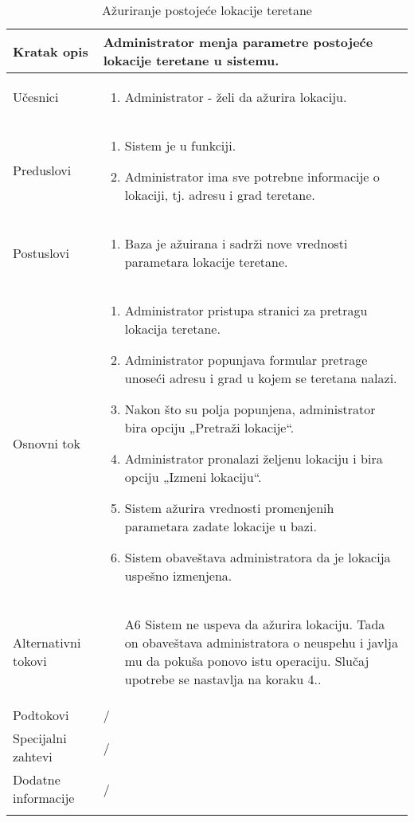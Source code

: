 \documentclass[../main.tex]{subfiles}
\begin{document}
\begin{longtable}{| p{} | p{} |} 

\hline
    Kratak opis &  Administrator menja parametre postojeće lokacije teretane u sistemu.\\ 
\hline    
    Učesnici & 
    	\begin{enumerate}
        \item Administrator - želi da ažurira lokaciju.
     \end{enumerate}\\
\hline
   Preduslovi & \begin{enumerate}
       \item Sistem je u funkciji.
       \item Administrator ima sve potrebne informacije o lokaciji, tj. adresu i grad teretane.
   \end{enumerate}\\
\hline  
    Postuslovi & \begin{enumerate}
        \item Baza je ažuirana i sadrži nove vrednosti parametara lokacije teretane.
    \end{enumerate}\\
\hline
    Osnovni tok & \begin{enumerate}
        \item Administrator pristupa stranici za pretragu lokacija teretane.
        \item Administrator popunjava formular pretrage unoseći adresu i grad u kojem se teretana nalazi.
        \item Nakon što su polja popunjena, administrator bira opciju „Pretraži lokacije“.
        \item Administrator pronalazi željenu lokaciju i bira opciju „Izmeni lokaciju“.
        \item Sistem ažurira vrednosti promenjenih parametara zadate lokacije u bazi.
        \item Sistem obaveštava administratora da je lokacija uspešno izmenjena.
    \end{enumerate}\\
\hline
    Alternativni tokovi & \begin{itemize}
        \item[A6]  Sistem ne uspeva da ažurira lokaciju. Tada on obaveštava administratora o neuspehu i javlja mu da pokuša ponovo istu operaciju. Slučaj upotrebe se nastavlja na koraku 4..

    \end{itemize}\\
\hline
    Podtokovi & /\\
\hline
    Specijalni zahtevi & /\\
\hline
    Dodatne informacije & /\\
\hline
\caption{Ažuriranje postojeće lokacije teretane} %
\end{longtable}
\end{document}
